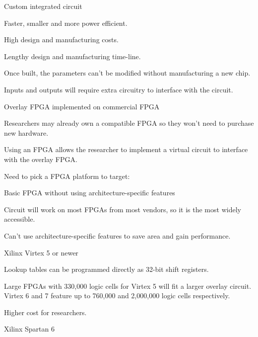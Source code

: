 \begin{enumeration}
\item Custom integrated circuit \
	\begin{itemlist}
		\item Faster, smaller and more power efficient.
		\item High design and manufacturing costs.
		\item Lengthy design and manufacturing time-line.
		\item Once built, the parameters can't be modified without manufacturing a new chip.
		\item Inputs and outputs will require extra circuitry to interface with the circuit.
	\end{itemlist}
\item Overlay FPGA implemented on commercial FPGA \
	\begin{itemlist}
		\item Researchers may already own a compatible FPGA so they won't need to purchase new hardware.
		\item Using an FPGA allows the researcher to implement a virtual circuit to interface with the overlay FPGA.
		\item Need to pick a FPGA platform to target:
		\begin{enumeration}
			\item Basic FPGA without using architecture-specific features
				\begin{itemlist}
					\item Circuit will work on most FPGAs from most vendors, so it is the most widely accessible.
					\item Can't use architecture-specific features to save area and gain performance.
				\end{itemlist}
			\item Xilinx Virtex 5 or newer \
				\begin{itemlist}
					\item Lookup tables can be programmed directly as 32-bit shift registers.
					\item Large FPGAs with 330,000 logic cells for Virtex 5\cite{xilinx-virtex5} will fit a larger overlay circuit. Virtex 6 and 7 feature up to 760,000 and 2,000,000 logic cells respectively\cite{xilinx-models}.
					\item Higher cost for researchers.
				\end{itemlist}
			\item Xilinx Spartan 6 \
				\begin{itemlist}

\end{itemlist}
\end{enumeration}
\end{itemlist}
\end{enumeration}
